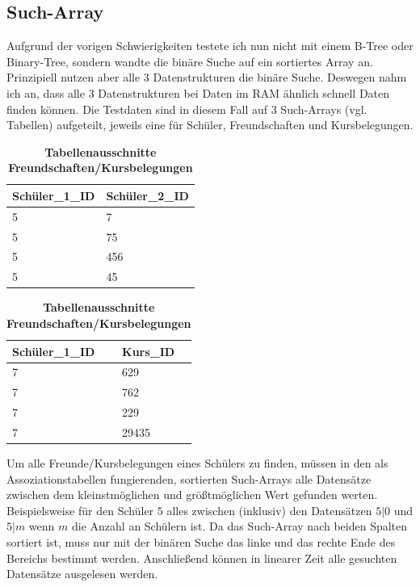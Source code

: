 \documentclass[11pt,a4paper]{article}
\begin{document}
\subsection{Such-Array}

Aufgrund der vorigen Schwierigkeiten testete ich nun nicht
mit einem B-Tree oder Binary-Tree, sondern wandte die binäre Suche
auf ein sortiertes Array an. Prinzipiell nutzen aber alle 3 Datenstrukturen die
binäre Suche. Deswegen nahm ich an, dass alle 3 Datenstrukturen bei Daten im RAM
ähnlich schnell Daten finden können.
Die Testdaten sind in diesem Fall auf 3 Such-Arrays (vgl. Tabellen)
aufgeteilt, jeweils eine für Schüler, Freundschaften und Kursbelegungen.

\begin{table}[H]
    \centering
    \begin{tabular}{|l|l|}
        \hline
        Schüler\_1\_ID & Schüler\_2\_ID \\ \hline
        5              & 7              \\ \hline
        5              & 75             \\ \hline
        5              & 456            \\ \hline
        5              & 45             \\ \hline
    \end{tabular}
    \qquad
    \begin{tabular}{|l|l|}
        \hline
        Schüler\_1\_ID & Kurs\_ID \\ \hline
        7              & 629            \\ \hline
        7              & 762            \\ \hline
        7              & 229            \\ \hline
        7              & 29435          \\ \hline
    \end{tabular}
    \caption{\textbf{Tabellenausschnitte Freundschaften/Kursbelegungen}}
\end{table}

Um alle Freunde/Kursbelegungen eines Schülers zu finden, müssen in
den als Assoziationstabellen fungierenden, sortierten Such-Arrays
alle Datensätze zwischen dem kleinstmöglichen und größtmöglichen Wert
gefunden werten. Beispielsweise für den Schüler $5$ alles zwischen (inklusiv) den Datensätzen
$5 | 0$ und $5 | m$ wenn $m$ die Anzahl an Schülern ist. Da das Such-Array
nach beiden Spalten sortiert ist, muss nur mit der binären Suche das linke
und das rechte Ende des Bereichs bestimmt werden. Anschließend können in linearer
Zeit alle gesuchten Datensätze ausgelesen werden.
\end{document}
